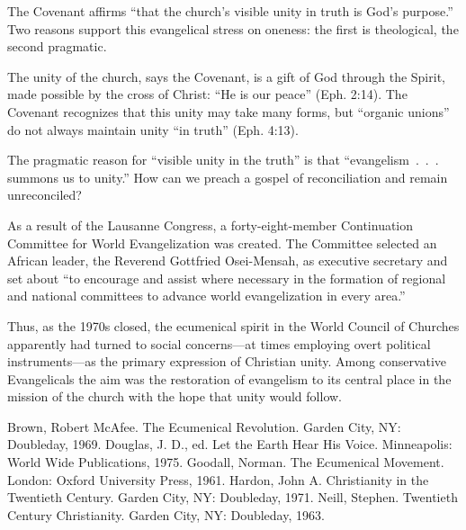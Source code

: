 The Covenant affirms “that the church’s visible unity in truth is God’s purpose.” Two reasons
support this evangelical stress on oneness: the first is theological, the second pragmatic.

The unity of the church, says the Covenant, is a gift of God through the Spirit, made possible by
the cross of Christ: “He is our peace” (Eph. 2:14). The Covenant recognizes that this unity may take
many forms, but “organic unions” do not always maintain unity “in truth” (Eph. 4:13).

The pragmatic reason for “visible unity in the truth” is that “evangelism~.~.~. summons us to
unity.” How can we preach a gospel of reconciliation and remain unreconciled?

As a result of the Lausanne Congress, a forty-eight-member Continuation Committee for World
Evangelization was created. The Committee selected an African leader, the Reverend Gottfried
Osei-Mensah, as executive secretary and set about “to encourage and assist where necessary in the
formation of regional and national committees to advance world evangelization in every area.”

Thus, as the 1970s closed, the ecumenical spirit in the World Council of Churches apparently had
turned to social concerns—at times employing overt political instruments—as the primary expression
of Christian unity. Among conservative Evangelicals the aim was the restoration of evangelism to its
central place in the mission of the church with the hope that unity would follow.

\begin{readinglist}
\entry Brown, Robert McAfee. The Ecumenical Revolution. Garden City, NY: Doubleday, 1969.
\entry Douglas, J. D., ed. Let the Earth Hear His Voice. Minneapolis: World Wide Publications, 1975.
\entry Goodall, Norman. The Ecumenical Movement. London: Oxford University Press, 1961.
\entry Hardon, John A. Christianity in the Twentieth Century. Garden City, NY: Doubleday, 1971.
\entry Neill, Stephen. Twentieth Century Christianity. Garden City, NY: Doubleday, 1963.
\end{readinglist}
